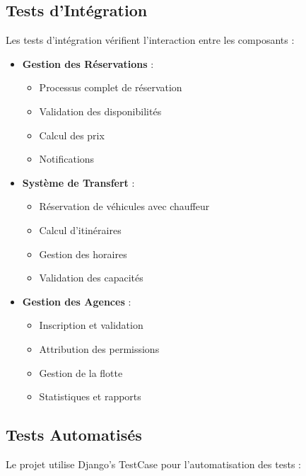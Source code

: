 \subsection{Tests d'Intégration}
Les tests d'intégration vérifient l'interaction entre les composants :

\begin{itemize}
    \item \textbf{Gestion des Réservations} :
    \begin{itemize}
        \item Processus complet de réservation
        \item Validation des disponibilités
        \item Calcul des prix
        \item Notifications
    \end{itemize}
    
    \item \textbf{Système de Transfert} :
    \begin{itemize}
        \item Réservation de véhicules avec chauffeur
        \item Calcul d'itinéraires
        \item Gestion des horaires
        \item Validation des capacités
    \end{itemize}
    
    \item \textbf{Gestion des Agences} :
    \begin{itemize}
        \item Inscription et validation
        \item Attribution des permissions
        \item Gestion de la flotte
        \item Statistiques et rapports
    \end{itemize}
\end{itemize}

\subsection{Tests Automatisés}
Le projet utilise Django's TestCase pour l'automatisation des tests :

